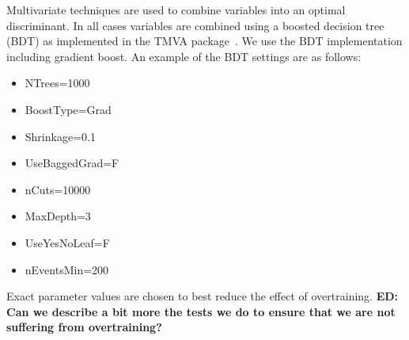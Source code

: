 \noindent

Multivariate techniques are used to combine variables into an optimal discriminant.  
In all cases variables are combined using a boosted decision tree (BDT) as implemented in the TMVA package~\cite{Hocker:2007ht}.
We use the BDT implementation including gradient boost.  
An example of the BDT settings are as follows: 
\begin{itemize}
\item NTrees=1000
\item BoostType=Grad
\item Shrinkage=0.1
\item UseBaggedGrad=F
\item nCuts=10000
\item MaxDepth=3
\item UseYesNoLeaf=F
\item nEventsMin=200
\end{itemize}
Exact parameter values are chosen to best reduce the effect of
overtraining.
{\bf ED: Can we describe a bit more the tests we do to ensure that we
  are not suffering from overtraining?}